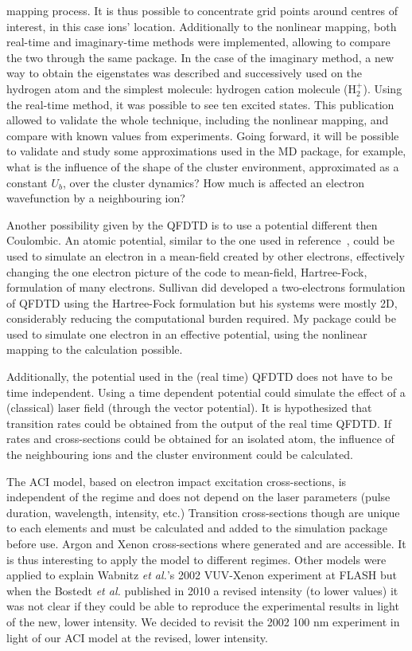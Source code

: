 mapping process. It is thus possible to concentrate grid points around centres
of interest, in this case ions' location. Additionally to the nonlinear mapping,
both real-time and imaginary-time methods were implemented, allowing to compare
the two through the same package. In the case of the imaginary method, a new
way to obtain the eigenstates was described and successively used on the
hydrogen atom and the simplest molecule: hydrogen cation molecule (H$_{2}^{+}$).
Using the real-time method, it was possible to see ten excited states. This
publication allowed to validate the whole technique, including the nonlinear
mapping, and compare with known values from experiments. Going forward, it will
be possible to validate and study some approximations used in the MD package,
for example, what is the influence of the shape of the cluster environment,
approximated as a constant $U_b$, over the cluster dynamics? How much is
affected an electron wavefunction by a neighbouring ion?

Another possibility given by the QFDTD is to use a potential different then
Coulombic. An atomic potential, similar to the one used in
reference~\cite{Walters2006}, could be used to simulate an electron in a
mean-field created by other electrons, effectively changing the one electron
picture of the code to mean-field, Hartree-Fock, formulation of many electrons.
Sullivan did developed a two-electrons formulation of QFDTD using the
Hartree-Fock formulation but his systems were mostly 2D, considerably reducing
the computational burden required. My package could be used to simulate one
electron in an effective potential, using the nonlinear mapping to the
calculation possible.

Additionally, the potential used in the (real time) QFDTD does not have to be
time independent. Using a time dependent potential could simulate the effect of
a (classical) laser field (through the vector potential). It is hypothesized
that transition rates could be obtained from the output of the real time QFDTD.
If rates and cross-sections could be obtained for an isolated atom, the
influence of the neighbouring ions and the cluster environment could be
calculated.


The ACI model, based on electron impact excitation cross-sections, is independent of the
regime and does not depend on the laser parameters (pulse duration, wavelength,
intensity, etc.) Transition cross-sections though are unique to each elements
and must be calculated and added to the simulation package before use. Argon
and Xenon cross-sections where generated and are accessible. It is thus
interesting to apply the model to different regimes. Other models were applied
to explain Wabnitz \textit{et al.}'s 2002 VUV-Xenon experiment at FLASH but when the
Bostedt \textit{et al.} published in 2010 a revised intensity (to lower values) it was
not clear if they could be able to reproduce the experimental results
in light of the new, lower intensity. We decided to revisit the 2002 100 nm
experiment in light of our ACI model at the revised, lower intensity.

